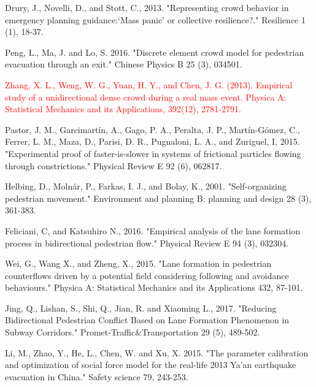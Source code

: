 \documentclass[preprint,12pt]{elsarticle}
\begin{document}
\begin{thebibliography}{10}
Drury, J., Novelli, D., and Stott, C., 2013. "Representing crowd behavior in 
emergency planning guidance:‘Mass panic’ or collective resilience?." Resilience 
1 (1), 18-37.
{}

Peng, L., Ma, J. and Lo, S. 2016. "Discrete element crowd model for 
pedestrian evacuation through an exit." Chinese Physics B 25 (3), 034501.
{}

\textcolor{red}{Zhang, X. L., Weng, W. G., Yuan, H. Y., and Chen, J. G. (2013). 
Empirical study of a unidirectional dense crowd during a real mass event. 
Physica A: Statistical Mechanics and its Applications, 392(12), 2781-2791.}


Pastor, J. M., Garcimart\'in, A., Gago, P. A., Peralta, J. P., 
Mart\'in-Gómez, C., Ferrer, L. M., Maza, D., Parisi, D. R., Pugnaloni, L. A., 
and Zuriguel, I, 2015. "Experimental proof of faster-is-slower in systems of 
frictional particles flowing through constrictions." Physical Review E 92 (6), 
062817. {}


Helbing, D., Moln\'ar, P., Farkas, I. J., and Bolay, K., 2001. "Self-organizing 
pedestrian movement." Environment and planning B: planning and design 
28 (3), 361-383.
{}

Feliciani, C, and Katsuhiro N., 2016. "Empirical analysis of the lane 
formation process in bidirectional pedestrian flow." Physical Review E 94 
(3), 032304.
{}


Wei, G., Wang X., and Zheng, X., 2015. "Lane formation in pedestrian 
counterflows driven by a potential field considering following and avoidance 
behaviours." Physica A: Statistical Mechanics and its Applications 432, 87-101.
{}

Jing, Q., Lishan, S., Shi, Q., Jian, R.  and Xiaoming L., 2017. 
"Reducing Bidirectional Pedestrian Conflict Based on Lane Formation Phenomenon 
in Subway Corridors." Promet-Traffic\&Transportation 29 (5), 489-502.
{}


Li, M., Zhao, Y., He, L., Chen, W. and Xu, X. 
2015. "The parameter calibration and optimization of social force model for the 
real-life 2013 Ya’an earthquake evacuation in China." Safety science 79, 
243-253.
{}

\end{thebibliography}
\end{document}
